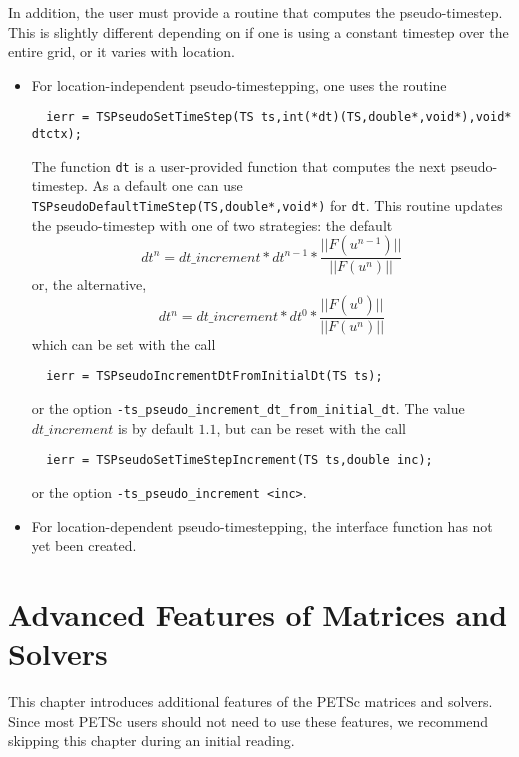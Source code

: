In addition, the user must provide a routine that computes the 
pseudo-timestep. This is slightly different depending on if 
one is using a constant timestep over the entire grid, or it varies
with location. 
\begin{itemize}
\item For location-independent pseudo-timestepping, one uses the routine 
\begin{verbatim}
  ierr = TSPseudoSetTimeStep(TS ts,int(*dt)(TS,double*,void*),void* dtctx);
\end{verbatim}
The function {\tt dt} is a user-provided function that computes the next 
pseudo-timestep. As a default one can use
{\tt TSPseudoDefaultTimeStep(TS,double*,void*)} for {\tt dt}. This routine
updates the pseudo-timestep with one of two strategies: the default
\[
   dt^{n} = dt\_increment*dt^{n-1}*\frac{|| F(u^{n-1}) ||}{|| F(u^{n})||}
\]
or, the alternative, 
\[
   dt^{n} = dt\_increment*dt^{0}*\frac{|| F(u^{0}) ||}{|| F(u^{n})||}
\]
which can be set with the call
\begin{verbatim}
  ierr = TSPseudoIncrementDtFromInitialDt(TS ts);
\end{verbatim}
or  
the option {\tt -ts\_pseudo\_increment\_dt\_from\_initial\_dt}. 
The value $ dt\_increment $ is by default $ 1.1$, but can be reset with the 
call 
\begin{verbatim}
  ierr = TSPseudoSetTimeStepIncrement(TS ts,double inc); 
\end{verbatim}
or  the option 
{\tt  -ts\_pseudo\_increment <inc>}. 


\item For location-dependent pseudo-timestepping, the interface function
      has not yet been created.
\end{itemize}

\chapter{Advanced Features of Matrices and Solvers}
\label{ch:advanced}

This chapter introduces additional features of the PETSc matrices and solvers.
Since most PETSc users should not need to use these features, 
we recommend skipping this chapter during an initial reading.

\medskip \medskip

